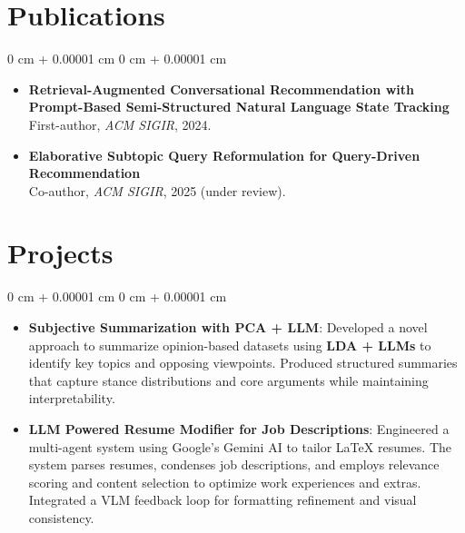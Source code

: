 \documentclass[10pt, letterpaper]{article}
\newenvironment{highlights}{
    \begin{itemize}[
        topsep=0.10 cm,
        parsep=0.10 cm,
        partopsep=0pt,
        itemsep=0pt,
        leftmargin=0 cm + 10pt
    ]
}{
    \end{itemize}
}
\newenvironment{onecolentry}{
    \begin{adjustwidth}{
        0 cm + 0.00001 cm
    }{
        0 cm + 0.00001 cm
    }
}{
    \end{adjustwidth}
}
\begin{document}
\section{Publications}
\begin{onecolentry}
    \begin{highlights}
    \item \textbf{Retrieval-Augmented Conversational Recommendation with Prompt-Based Semi-Structured Natural Language State Tracking} \\
    First-author, \textit{ACM SIGIR}, 2024. 

    \item \textbf{Elaborative Subtopic Query Reformulation for Query-Driven Recommendation} \\
    Co-author, \textit{ACM SIGIR}, 2025 (under review). %
    \end{highlights}
\end{onecolentry}



\section{Projects}
\vspace{0.10 cm}
\begin{onecolentry}
    \begin{highlights}
        \item \textbf{Subjective Summarization with PCA + LLM}: Developed a novel approach to summarize opinion-based datasets using \textbf{LDA + LLMs} to identify key topics and opposing viewpoints. Produced structured summaries that capture stance distributions and core arguments while maintaining interpretability.
        \item \textbf{LLM Powered Resume Modifier for Job Descriptions}: Engineered a multi-agent system using Google's Gemini AI to tailor LaTeX resumes. The system parses resumes, condenses job descriptions, and employs relevance scoring and content selection to optimize work experiences and extras. Integrated a VLM feedback loop for formatting refinement and visual consistency.
    \end{highlights}
\end{onecolentry}
\end{document}
